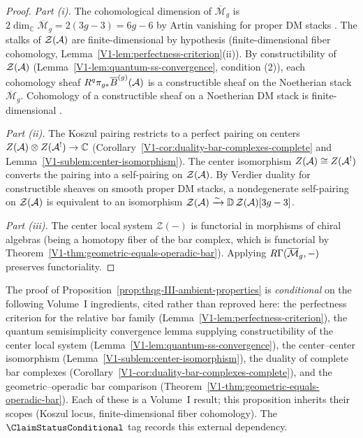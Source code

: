 \begin{proof}
\emph{Part (i).}
The cohomological dimension of $\overline{\mathcal{M}}_g$ is
$2 \dim_{\mathbb{C}} \overline{\mathcal{M}}_g = 2(3g - 3) = 6g - 6$
by Artin vanishing for proper DM stacks
\cite[\S4.1]{Olsson16}. The stalks of
$\mathcal{Z}(\mathcal{A})$ are finite-dimensional by hypothesis
(finite-dimensional fiber cohomology,
Lemma~\ref{V1-lem:perfectness-criterion}(ii)).
By constructibility of $\mathcal{Z}(\mathcal{A})$
(Lemma~\ref{V1-lem:quantum-ss-convergence}, condition (2)),
each cohomology sheaf $R^q\pi_{g*}\overline{B}^{(g)}(\mathcal{A})$
is a constructible sheaf on the Noetherian stack
$\overline{\mathcal{M}}_g$. Cohomology of a constructible
sheaf on a Noetherian DM stack is finite-dimensional
\cite[Theorem~18.1.1]{SAG}.

\emph{Part (ii).}
The Koszul pairing restricts to a perfect pairing on centers
$Z(\mathcal{A}) \otimes Z(\mathcal{A}^!) \to \mathbb{C}$
(Corollary~\ref{V1-cor:duality-bar-complexes-complete} and
Lemma~\ref{V1-sublem:center-isomorphism}).
The center isomorphism $Z(\mathcal{A}) \cong Z(\mathcal{A}^!)$ converts the
pairing into a self-pairing on $\mathcal{Z}(\mathcal{A})$.
By Verdier duality for constructible sheaves on smooth proper
DM stacks, a nondegenerate self-pairing on $\mathcal{Z}(\mathcal{A})$
is equivalent to an isomorphism
$\mathcal{Z}(\mathcal{A}) \xrightarrow{\sim}
\mathbb{D}\,\mathcal{Z}(\mathcal{A})[3g - 3]$.

\emph{Part (iii).}
The center local system $\mathcal{Z}(-)$ is functorial in
morphisms of chiral algebras (being a homotopy fiber of the
bar complex, which is functorial by
Theorem~\ref{V1-thm:geometric-equals-operadic-bar}).
Applying $R\Gamma(\overline{\mathcal{M}}_g, -)$ preserves
functoriality.
\end{proof}

\begin{remark}
\label{rem:thqg-III-ambient-properties-attribution}
The proof of
Proposition~\ref{prop:thqg-III-ambient-properties} is
\emph{conditional} on the following Volume~I ingredients, cited
rather than reproved here: the perfectness
criterion for the relative bar family
(Lemma~\ref{V1-lem:perfectness-criterion}), the quantum
semisimplicity convergence lemma supplying constructibility of the
center local system
(Lemma~\ref{V1-lem:quantum-ss-convergence}), the center--center
isomorphism
(Lemma~\ref{V1-sublem:center-isomorphism}), the duality of
complete bar complexes
(Corollary~\ref{V1-cor:duality-bar-complexes-complete}), and the
geometric--operadic bar comparison
(Theorem~\ref{V1-thm:geometric-equals-operadic-bar}). Each of
these is a Volume~I result; this proposition inherits their
scopes (Koszul locus, finite-dimensional fiber cohomology). The
$\ClaimStatusConditional$ tag records this external dependency.
\end{remark}

